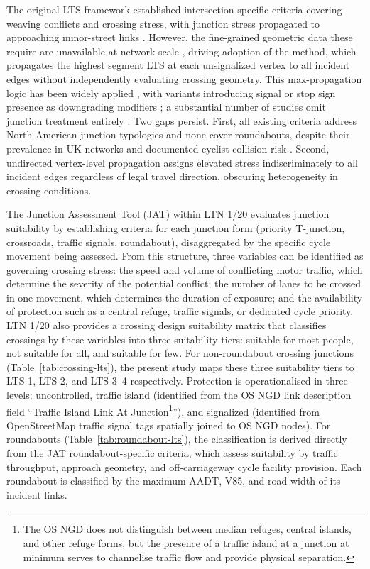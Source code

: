 The original LTS framework established intersection-specific criteria covering weaving conflicts and crossing stress, with junction stress propagated to approaching minor-street links \parencite{mekuria2012a,furth2016}. However, the fine-grained geometric data these require are unavailable at network scale \parencite{bearn2018,furth2018}, driving adoption of the \textcite{conveyal2015} method, which propagates the highest segment LTS at each unsignalized vertex to all incident edges without independently evaluating crossing geometry. This max-propagation logic has been widely applied \parencite{semler2017,murphy2019,huertas2020}, with variants introducing signal or stop sign presence as downgrading modifiers \parencite{bearn2018,lin2021}; a substantial number of studies omit junction treatment entirely \parencite{wang2022,viero2025}. Two gaps persist. First, all existing criteria address North American junction typologies and none cover roundabouts, despite their prevalence in UK networks and documented cyclist collision risk \parencite{daniels2009,aldred2021,poudel2021,rodrigues2022}. Second, undirected vertex-level propagation assigns elevated stress indiscriminately to all incident edges regardless of legal travel direction, obscuring heterogeneity in crossing conditions.

The Junction Assessment Tool (JAT) within LTN 1/20 evaluates junction suitability by
establishing criteria for each junction form (priority T-junction, crossroads,
traffic signals, roundabout), disaggregated by the specific cycle movement being
assessed. From this structure, three variables can be identified as governing
crossing stress: the speed and volume of conflicting motor traffic, which determine
the severity of the potential conflict; the number of lanes to be crossed in one movement,
which determines the duration of exposure; and the availability of protection such
as a central refuge, traffic signals, or dedicated cycle priority. LTN 1/20 also
provides a crossing design suitability matrix that classifies crossings by these
variables into three suitability tiers: suitable for most people, not suitable for
all, and suitable for few. For non-roundabout crossing junctions
(Table~\ref{tab:crossing-lts}), the present study maps these three suitability tiers
to LTS 1, LTS 2, and LTS 3--4 respectively. Protection is operationalised in three
levels: uncontrolled, traffic island (identified from the OS NGD link description
field ``Traffic Island Link At Junction\footnote{The OS NGD does
not distinguish between median refuges, central islands, and other refuge forms, but
the presence of a traffic island at a junction at minimum serves to channelise
traffic flow and provide physical separation.}''), and signalized (identified from
OpenStreetMap traffic signal tags spatially joined to OS NGD nodes).  For roundabouts
(Table~\ref{tab:roundabout-lts}), the classification is derived directly from the JAT
roundabout-specific criteria, which assess suitability by traffic throughput,
approach geometry, and off-carriageway cycle facility provision. Each roundabout is classified by the maximum AADT, V85, and road width of its incident links.


